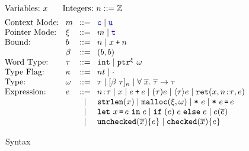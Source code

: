 \begin{figure}
  \small \centering
  \[ \hspace*{-1.5em}
\setlength{\arraycolsep}{4pt}
\begin{array}{l}
\begin{array}{ll}
       \text{Variables:}~ x
& \quad\text{Integers:}~n::=\mathbb{Z} 
\end{array}
\\[0.5em]
\begin{array}{llcllcl}
\text{Context Mode:} & m & ::= & \cmode \mid \umode \\
\text{Pointer Mode:} & \xi & ::= & m \mid \tmode \\
\text{Bound:} & b & ::= & n \mid x \plus n \\
              & \bvar & ::= & (b,b) \\
  
     \text{Word Type:}& \tau &::=& \tint\mid \tptr{\omega}{ \xi}
\\
\text{Type Flag:}&\kappa &::=& nt \mid \cdot
\\
\text{Type:}&\omega &::=& \tau \mid \tallarrayb{\bvar}{\tau} \mid \tfun{\overline{x}}{\overline{\tau}}{\tau}
\\
\text{Expression:}& e & ::= & 
\evalue{n}{\tau} \mid x \mid \ebinop{e}{e}\mid \ecast{\tau}{e} \mid \edyncast{\tau}{e}
\mid \ret{x}{\evalue{n}{\tau}}{e}
  \\
&&\mid& \estrlen{x} \mid \emalloc{\xi}{\omega} \mid\estar{e}\mid\eassign{e}{e}  \\
&&\mid& \elet{x}{e}{e} \mid \eif{e}{e}{e} \mid \ecall{e}{\overline{e}}
\\
&&\mid&\eunchecked{\overline{x}}{e}
\mid \echecked{\overline{x}}{e}
\end{array}
    \end{array}
  \]
  \caption{\lang Syntax}
  \label{fig:checkc-syn}
\end{figure}

